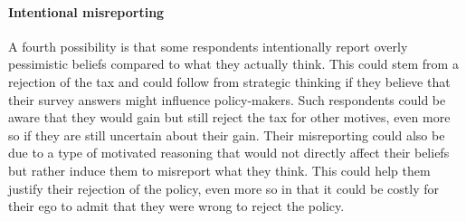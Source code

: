 \documentclass[12pt]{article} %
\begin{document}


\paragraph{Intentional misreporting}

A fourth possibility is that some respondents intentionally report overly pessimistic beliefs compared to what they actually think. This could stem from a rejection of the tax and could follow from strategic thinking if they believe that their survey answers might influence policy-makers. Such respondents could be aware that they would gain but still reject the tax for other motives, even more so if they are still uncertain about their gain. Their misreporting could also be due to a type of motivated reasoning that would not directly affect their beliefs but rather induce them to misreport what they think. This could help them justify their rejection of the policy, even more so in that it could be costly for their ego to admit that they were wrong to reject the policy.


\end{document}
